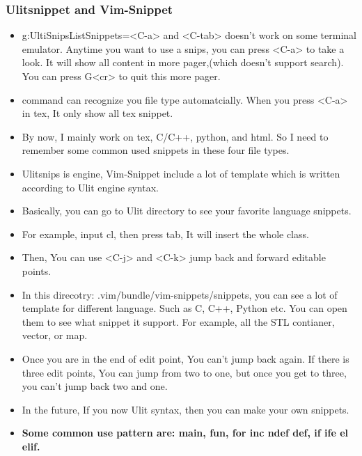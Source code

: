 \documentclass[a4paper,12pt,twoside]{book}
\begin{document}
\subsubsection{Ulitsnippet and Vim-Snippet}
\begin{itemize}
		\item g:UltiSnipsListSnippets=<C-a> and <C-tab> doesn't work on some terminal emulator. Anytime you want to use a snips, you can press <C-a> to take a look. It will show all content in more pager,(which doesn't support search). You can press G<cr> to quit this more pager.

		\item <C-a> command can recognize you file type automatcially. When you press <C-a> in tex, It only show all tex snippet. 

		\item By now, I mainly work on tex, C/C++, python, and html. So I need to remember some common used snippets in these four file types. 

\item Ulitsnips is engine, Vim-Snippet include a lot of template which is written according to Ulit engine syntax. 

\item Basically, you can go to Ulit directory to see your favorite language snippets. 

\item For example, input cl, then press tab, It will insert the whole class. 

\item Then, You can use <C-j> and <C-k> jump back and forward editable points. 

\item In this direcotry: .vim/bundle/vim-snippets/snippets, you can see a lot of template for different language. Such as C, C++, Python etc. You can open them to see what snippet it support. For example, all the STL contianer, vector, or map. 

\item Once you are in the end of edit point, You can't jump back again. If there is three edit points, You can jump from two to one, but once you get to three, you can't jump back two and one. 

\item In the future, If you now Ulit syntax, then you can make your own snippets. 
\item \textbf{Some common use pattern are: 	main, fun, for inc ndef def, if ife el elif.} 


\end{itemize}
\end{document}
